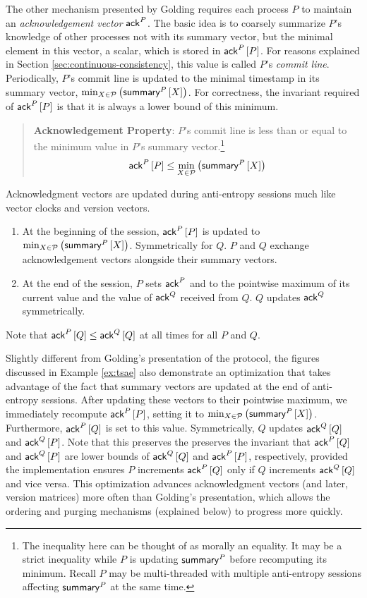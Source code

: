 \documentclass[]             %
{NASA}                       %
\theoremstyle{definition}
\begin{document}
The other mechanism presented by Golding requires each process $P$
to maintain an \emph{acknowledgement vector} $\mathsf{ack}^{P}$. The basic idea
is to coarsely summarize $P$'s knowledge of other processes not with
its summary vector, but the minimal element in this vector, a scalar,
which is stored in $\mathsf{ack}^{P}\left[P\right]$. For reasons explained in
Section \ref{sec:continuous-consistency}, this value is called $P$'s \emph{commit
  line}. Periodically, $P$'s commit line is updated to the minimal
timestamp in its summary vector,
$\min_{X \in \mathcal{P}} \left(\mathsf{summary}^{P}\left[X\right]\right)$.  For correctness,
the invariant required of $\mathsf{ack}^{P}\left[P\right]$ is that it is always a lower
bound of this minimum.
\begin{quote}
  \textbf{Acknowledgement Property}: $P$'s commit line is less than or
  equal to the minimum value in $P$'s summary vector.\footnote{The
    inequality here can be thought of as morally an equality. It may
    be a strict inequality while $P$ is updating $\mathsf{summary}^{P}$
    before recomputing its minimum. Recall $P$ may be multi-threaded
    with multiple anti-entropy sessions affecting $\mathsf{summary}^{P}$ at
    the same time.}
  \begin{equation*}
    \mathsf{ack}^{P}\left[P\right] \leq \min_{X \in \mathcal{P}} \left(\mathsf{summary}^{P}\left[X\right]\right)
\end{equation*}
\end{quote}

Acknowledgment vectors are updated during anti-entropy sessions much
like vector clocks and version vectors.
\begin{enumerate}
\item At the beginning of the session, $\mathsf{ack}^{P}\left[P\right]$ is updated to
  $\min_{X \in \mathcal{P}} \left(\mathsf{summary}^{P}\left[X\right]\right)$. Symmetrically
  for $Q$. $P$ and $Q$ exchange acknowledgement vectors alongside
  their summary vectors.
\item At the end of the session, $P$ sets $\mathsf{ack}^{P}$ and to the
  pointwise maximum of its current value and the value of $\mathsf{ack}^{Q}$
  received from $Q$. $Q$ updates $\mathsf{ack}^{Q}$ symmetrically.
\end{enumerate}
Note that $\mathsf{ack}^{P}\left[Q\right] \leq \mathsf{ack}^{Q}\left[Q\right]$ at all times for all $P$ and
$Q$.

Slightly different from Golding's presentation of the protocol, the
figures discussed in Example \ref{ex:tsae} also demonstrate an
optimization that takes advantage of the fact that summary vectors are
updated at the end of anti-entropy sessions. After updating these
vectors to their pointwise maximum, we immediately recompute
$\mathsf{ack}^{P}\left[P\right]$, setting it to
$\min_{X \in \mathcal{P}} \left(\mathsf{summary}^{P}\left[X\right]\right)$. Furthermore,
$\mathsf{ack}^{P}\left[Q\right]$ is set to this value. Symmetrically, $Q$ updates
$\mathsf{ack}^{Q}\left[Q\right]$ and $\mathsf{ack}^{Q}\left[P\right]$. Note that this preserves the preserves
the invariant that $\mathsf{ack}^{P}\left[Q\right]$ and $\mathsf{ack}^{Q}\left[P\right]$ are lower bounds of
$\mathsf{ack}^{Q}\left[Q\right]$ and $\mathsf{ack}^{P}\left[P\right]$, respectively, provided the
implementation ensures $P$ increments $\mathsf{ack}^{P}\left[Q\right]$ only if $Q$
increments $\mathsf{ack}^{Q}\left[Q\right]$ and vice versa. This optimization advances
acknowledgment vectors (and later, version matrices) more often than
Golding's presentation, which allows the ordering and purging
mechanisms (explained below) to progress more quickly.
\end{document}
